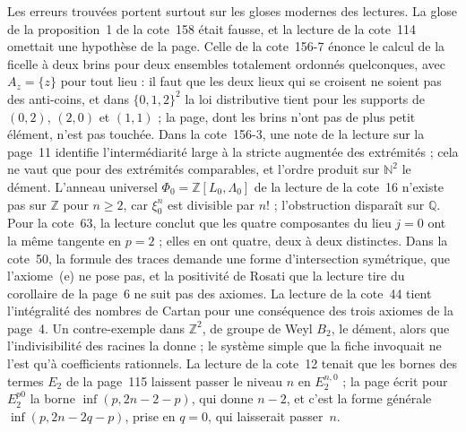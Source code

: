Les erreurs trouvées portent surtout sur les gloses modernes des lectures. La glose de la proposition~1 de la cote~158 était fausse, et la lecture de la cote~114 omettait une hypothèse de la page. Celle de la cote~156-7 énonce le calcul de la ficelle à deux brins pour deux ensembles totalement ordonnés quelconques, avec $A_z = \{z\}$ pour tout lieu : il faut que les deux lieux qui se croisent ne soient pas des anti-coins, et dans $\{0, 1, 2\}^2$ la loi distributive tient pour les supports de $(0, 2)$, $(2, 0)$ et $(1, 1)$ ; la page, dont les brins n'ont pas de plus petit élément, n'est pas touchée. Dans la cote~156-3, une note de la lecture sur la page~11 identifie l'intermédiarité large à la stricte augmentée des extrémités ; cela ne vaut que pour des extrémités comparables, et l'ordre produit sur $\mathbb N^2$ le dément. L'anneau universel $\Phi_0 = \mathbb Z[L_0, \Lambda_0]$ de la lecture de la cote~16 n'existe pas sur $\mathbb Z$ pour $n \geqslant 2$, car $\xi_0^n$ est divisible par $n!$ ; l'obstruction disparaît sur $\mathbb Q$. Pour la cote~63, la lecture conclut que les quatre composantes du lieu $j = 0$ ont la même tangente en $p = 2$ ; elles en ont quatre, deux à deux distinctes. Dans la cote~50, la formule des traces demande une forme d'intersection symétrique, que l'axiome~(e) ne pose pas, et la positivité de Rosati que la lecture tire du corollaire de la page~6 ne suit pas des axiomes. La lecture de la cote~44 tient l'intégralité des nombres de Cartan pour une conséquence des trois axiomes de la page~4. Un contre-exemple dans $\mathbb Z^2$, de groupe de Weyl $B_2$, le dément, alors que l'indivisibilité des racines la donne ; le système simple que la fiche invoquait ne l'est qu'à coefficients rationnels. La lecture de la cote~12 tenait que les bornes des termes $E_2$ de la page~115 laissent passer le niveau $n$ en $E_2^{n,0}$ ; la page écrit pour $E_2^{p0}$ la borne $\inf(p, 2n - 2 - p)$, qui donne $n - 2$, et c'est la forme générale $\inf(p, 2n - 2q - p)$, prise en $q = 0$, qui laisserait passer~$n$.

